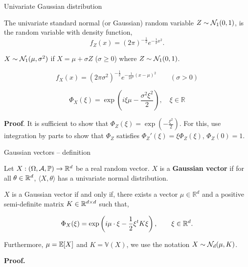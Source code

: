 \documentclass[10pt]{beamer}
\begin{document}
  \begin{frame}{Univariate Gaussian distribution}

    The univariate standard normal (or Gaussian) random variable  $Z \sim
    \mathcal{N}_1(0,1)$, is the random variable with density function,
    $$f_Z(x)=(2\pi)^{-\frac{1}{2}} e^{-\frac{1}{2}x^{2}}.$$

    \pause

    $X \sim \mathcal{N}_1(\mu,\sigma^2)$ if $X = \mu + \sigma Z$
    ($\sigma \geq 0$) where  $Z \sim \mathcal{N}_1(0,1)$.

    $$f_X(x)=(2
    \pi\sigma^2)^{-\frac{1}{2}} e^{-\frac{1}{2\sigma^2}(x-\mu)^{2}} \qquad
    (\sigma > 0) $$

    \pause

      $$
      \boxed{\Phi_{X}(\xi)=\exp \left(i\xi \mu -\frac{\sigma^{2} \xi^{2}}{2}\right), \quad \xi \in \mathbb{R}}
      $$

      \pause

      \textbf{Proof}. It is sufficient to show that $\Phi_{Z}(\xi)=\exp
      \left(-\frac{\xi^{2}}{2}\right)$. For this, use integration by parts to
      show that $\Phi_Z$ satisfies $\Phi_Z'(\xi) = \xi\Phi_Z(\xi)$, $\Phi_Z(0) =
      1$.
  \end{frame}

  \begin{frame}{Gaussian vectors -- definition}
    \begin{definition}
      Let $X:(\Omega,\mathcal{A},\mathbb{P}) \to \mathbb{R}^{d}$ be a real random vector. $X$ is a \textbf{Gaussian
        vector} if for all $\theta \in \mathbb{R}^{d}$, $\langle X, \theta \rangle$ has a
      univariate normal distribution.
    \end{definition}

    \pause

    \begin{theorem} $X$ is a Gaussian vector if and only if, there exists a
      vector $\mu \in \mathbb{R}^{d}$ and a positive semi-definite matrix $K \in \mathbb{R}^{d \times d}$ such that,

      \begin{equation}
        \Phi_{X}(\xi)=\exp \left(i \mu \cdot \xi-\frac{1}{2} \xi^t K \xi\right),
        \qquad \xi \in \mathbb{R}^{d}.
      \end{equation}

      Furthermore, $\mu = \mathbb{E}[X]$ and $K = \mathbb{V}(X)$, we use the notation
      $X \sim \mathcal{N}_d(\mu,K)$.
    \end{theorem}

    \pause
    \textbf{Proof.}
  \end{frame}
\end{document}
